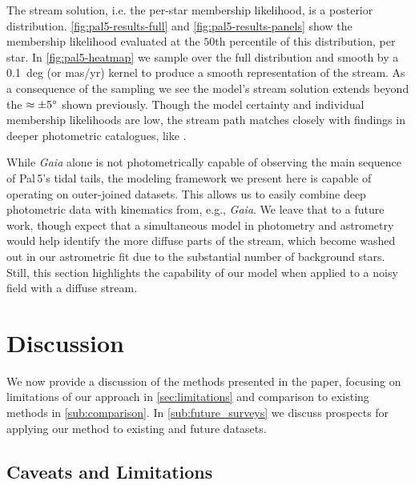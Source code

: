 \documentclass[twocolumn, linenumbers]{aastex631}
\newcommand{\stream}[1]{#1}
\newcommand{\dataarchive}[1]{\textit{#1}}
\newcommand{\Gaia}{\dataarchive{Gaia}}
\begin{document}
        The stream solution, i.e. the per-star membership likelihood, is a
        posterior distribution. \autoref{fig:pal5-results-full} and
        \autoref{fig:pal5-results-panels} show the membership likelihood
        evaluated at the $50$th percentile of this distribution, per star. In
        \autoref{fig:pal5-heatmap} we sample over the full distribution and
        smooth by a 0.1~deg (or mas/yr) kernel to produce a smooth
        representation of the stream. As a consequence of the sampling we see
        the model's stream solution extends beyond the $\approx \pm5\degree$
        shown previously.  Though the model certainty and individual membership
        likelihoods are low, the stream path matches closely with findings in
        deeper photometric catalogues, like \citet{Ibata+2017}.

        While \Gaia{} alone is not photometrically capable of observing the main
        sequence of \stream{Pal\,5}'s tidal tails, the modeling framework we
        present here is capable of operating on outer-joined datasets. This
        allows us to easily combine deep photometric data with kinematics from,
        e.g., \Gaia{}.  We leave that to a future work, though expect that a
        simultaneous model in photometry and astrometry would help identify the
        more diffuse parts of the stream, which become washed out in our
        astrometric fit due to the substantial number of background stars.
        Still, this section highlights the capability of our model when applied
        to a noisy field with a diffuse stream.




\section{Discussion} \label{sec:discussion}

    We now provide a discussion of the methods presented in the paper, focusing
    on limitations of our approach in \autoref{sec:limitations} and comparison
    to existing methods in \autoref{sub:comparison}. In
    \autoref{sub:future_surveys} we discuss prospects for applying our method to
    existing and future datasets.

    \subsection{Caveats and Limitations}\label{sec:limitations}
\end{document}

